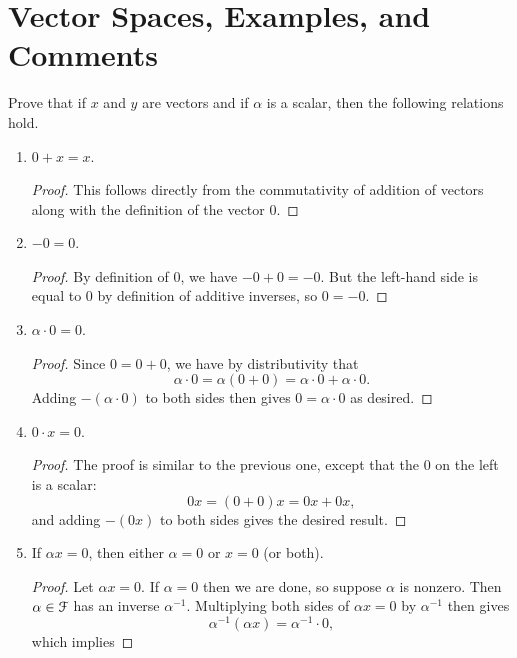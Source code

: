 \section{Vector Spaces, Examples, and Comments}

 Prove that if $x$ and $y$ are vectors and if $\alpha$ is a
scalar, then the following relations hold.
\begin{enumerate}
\item $0 + x = x$.
  \begin{proof}
    This follows directly from the commutativity of addition of
    vectors along with the definition of the vector $0$.
  \end{proof}
\item $-0 = 0$.
  \begin{proof}
    By definition of $0$, we have $-0 + 0 = -0$. But the left-hand
    side is equal to $0$ by definition of additive inverses, so
    $0 = -0$.
  \end{proof}
\item $\alpha\cdot0 = 0$.
  \begin{proof}
    Since $0 = 0 + 0$, we have by distributivity that
    \begin{equation*}
      \alpha\cdot0 = \alpha(0 + 0) = \alpha\cdot0 + \alpha\cdot0.
    \end{equation*}
    Adding $-(\alpha\cdot0)$ to both sides then gives
    $0 = \alpha\cdot0$ as desired.
  \end{proof}
\item $0\cdot x = 0$.
  \begin{proof}
    The proof is similar to the previous one, except that the $0$ on
    the left is a scalar:
    \begin{equation*}
      0x = (0 + 0)x = 0x + 0x,
    \end{equation*}
    and adding $-(0x)$ to both sides gives the desired result.
  \end{proof}
\item If $\alpha x = 0$, then either $\alpha = 0$ or $x = 0$ (or
  both).
  \begin{proof}
    Let $\alpha x = 0$. If $\alpha = 0$ then we are done, so suppose
    $\alpha$ is nonzero. Then $\alpha\in\mathcal{F}$ has an inverse
    $\alpha^{-1}$. Multiplying both sides of $\alpha x = 0$ by
    $\alpha^{-1}$ then gives
    \begin{equation*}
      \alpha^{-1}(\alpha x) = \alpha^{-1}\cdot0,
    \end{equation*}
    which implies

\end{proof}
\end{enumerate}
